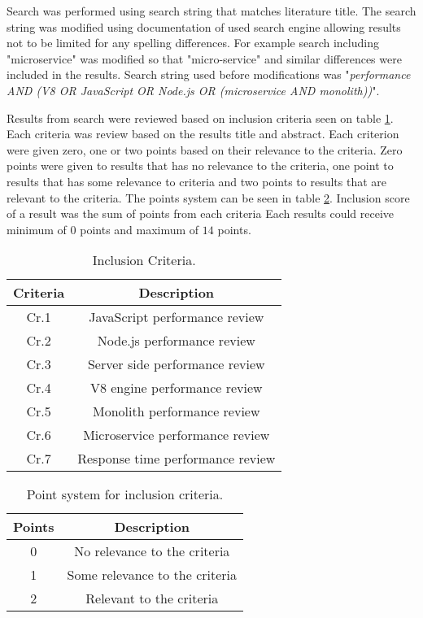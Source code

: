 Search was performed using search string that matches literature title.
The search string was modified using documentation of used search engine allowing results not to be limited for any spelling differences.
For example search including "microservice" was modified so that "micro-service" and similar differences were included in the results.
Search string used before modifications was "\textit{performance AND (V8 OR JavaScript OR Node.js OR (microservice AND monolith))}".

Results from search were reviewed based on inclusion criteria seen on table \ref{table:literature:inclusionCriteria}.
Each criteria was review based on the results title and abstract.
Each criterion were given zero, one or two points based on their relevance to the criteria.
Zero points were given to results that has no relevance to the criteria, one point to results that has some relevance to criteria and two points to results that are relevant to the criteria.
The points system can be seen in table \ref{table:literature:pointSystem}.
Inclusion score of a result was the sum of points from each criteria
Each results could receive minimum of $0$ points and maximum of $14$ points.

\begin{table}[h!]
    \begin{tabular}{|c c|} 
        \hline
        Criteria & Description \\ [0.5ex] 
        \hline
        Cr.1 & JavaScript performance review
        \\ 
        \hline
        Cr.2 & Node.js performance review  \\ 
        \hline
        Cr.3 & Server side performance review  \\ 
        \hline
        Cr.4 & V8 engine performance review  \\ 
        \hline
        Cr.5 & Monolith performance review  \\ 
        \hline
        Cr.6 & Microservice performance review  \\ 
        \hline
        Cr.7 & Response time performance review  \\ 
        \hline
    \end{tabular}    
    \caption{Inclusion Criteria.}
    \label{table:literature:inclusionCriteria}
\end{table}

\begin{table}[h!]
    \begin{tabular}{|c c|}
        \hline
        Points & Description \\ [0.5ex] 
        \hline
         0 & No relevance to the criteria  \\ 
        \hline
         1 & Some relevance to the criteria \\ 
        \hline
        2 & Relevant to the criteria \\ 
        \hline
    \end{tabular}
    \caption{Point system for inclusion criteria.}
    \label{table:literature:pointSystem}
\end{table}

